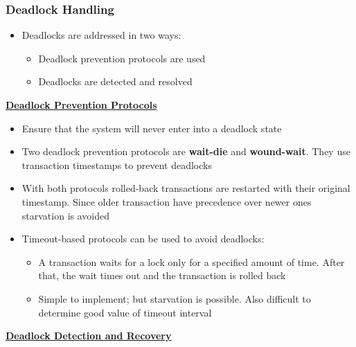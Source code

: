 \subsubsection{Deadlock Handling}

\begin{itemize}[label=\(\rhd\)]
    \item Deadlocks are addressed in two ways: 
    \begin{itemize}[label=\(\rhd\)]
        \item Deadlock prevention protocols are used
        \item Deadlocks are detected and resolved
    \end{itemize}
\end{itemize}

\bigskip
\textbf{\underline{Deadlock Prevention Protocols}}\\

\begin{itemize}[label=\(\rhd\)]
    \item Ensure that the system will never enter into a deadlock state
    \item Two deadlock prevention protocols are \textbf{wait-die} and \textbf{wound-wait}. They use transaction timestamps to prevent deadlocks
    \item With both protocols rolled-back transactions are restarted with their original timestamp. Since older transaction have precedence over newer ones starvation is avoided
    \item Timeout-based protocols can be used to avoid deadlocks:
    \begin{itemize}[label=\(\rhd\)]
        \item A transaction waits for a lock only for a specified amount of time. After that, the wait times out and the transaction is rolled back
        \item Simple to implement; but starvation is possible. Also difficult to determine good value of timeout interval 
    \end{itemize}
\end{itemize}

\bigskip
\textbf{\underline{Deadlock Detection and Recovery}}\\

